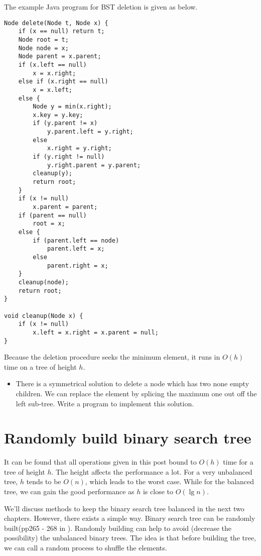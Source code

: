 \documentclass{article}
\begin{document}
The example Java program for BST deletion is given as below.

\lstset{language=Java}
\begin{lstlisting}
Node delete(Node t, Node x) {
    if (x == null) return t;
    Node root = t;
    Node node = x;
    Node parent = x.parent;
    if (x.left == null)
        x = x.right;
    else if (x.right == null)
        x = x.left;
    else {
        Node y = min(x.right);
        x.key = y.key;
        if (y.parent != x)
            y.parent.left = y.right;
        else
            x.right = y.right;
        if (y.right != null)
            y.right.parent = y.parent;
        cleanup(y);
        return root;
    }
    if (x != null)
        x.parent = parent;
    if (parent == null)
        root = x;
    else {
        if (parent.left == node)
            parent.left = x;
        else
            parent.right = x;
    }
    cleanup(node);
    return root;
}

void cleanup(Node x) {
    if (x != null)
        x.left = x.right = x.parent = null;
}
\end{lstlisting}

Because the deletion procedure seeks the minimum element, it runs in $O(h)$ time on a tree of height $h$.

\begin{Exercise}

\begin{itemize}
\item There is a symmetrical solution to delete a node which has two
none empty children. We can replace the element by splicing the maximum one out off the left sub-tree. Write a program to implement this solution.
\end{itemize}

\end{Exercise}

\section{Randomly build binary search tree}
It can be found that all operations given in this post bound to $O(h)$
time for a tree of height $h$. The height affects the performance
a lot. For a very unbalanced tree, $h$ tends to be $O(n)$, which leads
to the worst case. While for the balanced tree, we can gain the good performance as $h$ is close to $O(\lg n)$.

We'll discuss methods to keep the binary search tree
balanced in the next two chapters. However, there exists a simple
way. Binary search tree can be randomly built(pp265 - 268 in \cite{CLRS}).
Randomly building can help to avoid (decrease the possibility) the unbalanced
binary trees. The idea is that before building the tree, we can call a random process to shuffle the elements.
\end{document}

